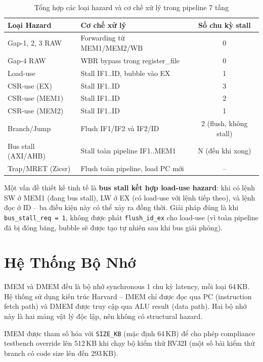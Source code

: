 \begin{table}[htbp]
\caption{Tổng hợp các loại hazard và cơ chế xử lý trong pipeline 7 tầng}
\label{tab:hazard}
\begin{center}
\begin{tabular}{|l|l|c|}
\hline
\textbf{Loại Hazard} & \textbf{Cơ chế xử lý} & \textbf{Số chu kỳ stall} \\ \hline
Gap-1, 2, 3 RAW & Forwarding từ MEM1/MEM2/WB & 0 \\ \hline
Gap-4 RAW & WBR bypass trong register\_file & 0 \\ \hline
Load-use & Stall IF1..ID, bubble vào EX & 1 \\ \hline
CSR-use (EX) & Stall IF1..ID & 3 \\ \hline
CSR-use (MEM1) & Stall IF1..ID & 2 \\ \hline
CSR-use (MEM2) & Stall IF1..ID & 1 \\ \hline
Branch/Jump & Flush IF1/IF2 và IF2/ID & 2 (flush, không stall) \\ \hline
Bus stall (AXI/AHB) & Stall toàn pipeline IF1..MEM1 & N (đến khi xong) \\ \hline
Trap/MRET (Zicsr) & Flush toàn pipeline, load PC mới & -- \\ \hline
\end{tabular}
\end{center}
\end{table}

Một vấn đề thiết kế tinh tế là \textbf{bus stall kết hợp load-use hazard}: khi có lệnh SW ở MEM1 (đang bus stall), LW ở EX (có load-use với lệnh tiếp theo), và lệnh đọc ở ID -- ba điều kiện này có thể xảy ra đồng thời. Giải pháp đúng là khi \texttt{bus\_stall\_req = 1}, không được phát \texttt{flush\_id\_ex} cho load-use (vì toàn pipeline đã bị đóng băng, bubble sẽ được tạo tự nhiên sau khi bus giải phóng).

\section{Hệ Thống Bộ Nhớ}

IMEM và DMEM đều là bộ nhớ synchronous 1 chu kỳ latency, mỗi loại 64\,KB. Hệ thống sử dụng kiến trúc Harvard -- IMEM chỉ được đọc qua PC (instruction fetch path) và DMEM được truy cập qua ALU result (data path). Hai bộ nhớ này là hai mảng vật lý độc lập, nên không có structural hazard.

IMEM được tham số hóa với \texttt{SIZE\_KB} (mặc định 64\,KB) để cho phép compliance testbench override lên 512\,KB khi chạy bộ kiểm thử RV32I (một số bài kiểm thử branch có code size lên đến 293\,KB).

